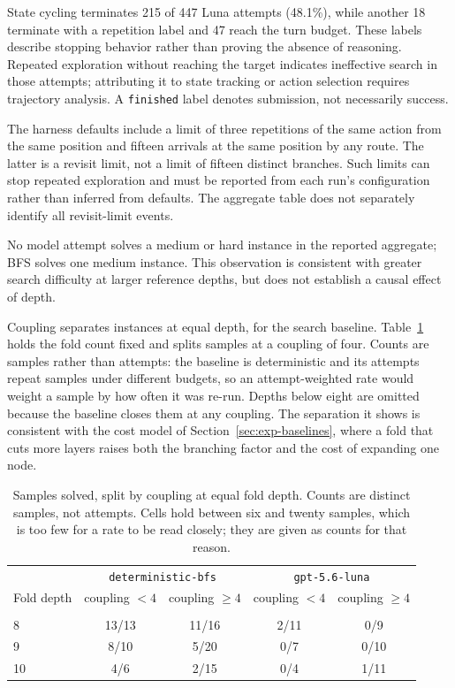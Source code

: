 State cycling terminates 215 of 447 Luna attempts (48.1\%), while another 18 terminate with a
repetition label and 47 reach the turn budget. These labels describe stopping behavior rather
than proving the absence of reasoning. Repeated exploration without reaching the target indicates
ineffective search in those attempts; attributing it to state tracking or action selection
requires trajectory analysis. A \texttt{finished} label denotes submission, not necessarily success.

The harness defaults include a limit of three repetitions of the same action from the same
position and fifteen arrivals at the same position by any route. The latter is a revisit limit,
not a limit of fifteen distinct branches. Such limits can stop repeated exploration and must be
reported from each run's configuration rather than inferred from defaults. The aggregate table
does not separately identify all revisit-limit events.

\label{sec:results-difficulty}

No model attempt solves a medium or hard instance in the reported aggregate; BFS solves one
medium instance. This observation is consistent with greater search difficulty at larger reference
depths, but does not establish a causal effect of depth.

Coupling separates instances at equal depth, for the search baseline.
Table~\ref{tab:coupling} holds the fold count fixed and splits samples at a coupling of four.
Counts are samples rather than attempts: the baseline is deterministic and its attempts repeat
samples under different budgets, so an attempt-weighted rate would weight a sample by how often
it was re-run. Depths below eight are omitted because the baseline closes them at any coupling.
The separation it shows is consistent with the cost model of Section~\ref{sec:exp-baselines},
where a fold that cuts more layers raises both the branching factor and the cost of expanding
one node.

\begin{table}[h]
\caption{Samples solved, split by coupling at equal fold depth. Counts are distinct samples, not
attempts. Cells hold between six and twenty samples, which is too few for a rate to be read
closely; they are given as counts for that reason.}
\label{tab:coupling}
\begin{center}
\small
\begin{tabular}{lcccc}
& \multicolumn{2}{c}{\texttt{deterministic-bfs}} & \multicolumn{2}{c}{\texttt{gpt-5.6-luna}} \\
Fold depth & coupling $<4$ & coupling $\geq 4$ & coupling $<4$ & coupling $\geq 4$ \\
\hline \\
8  & 13/13 & 11/16 & 2/11 & 0/9 \\
9  & 8/10  & 5/20  & 0/7  & 0/10 \\
10 & 4/6   & 2/15  & 0/4  & 1/11 \\
\end{tabular}
\end{center}
\end{table}

